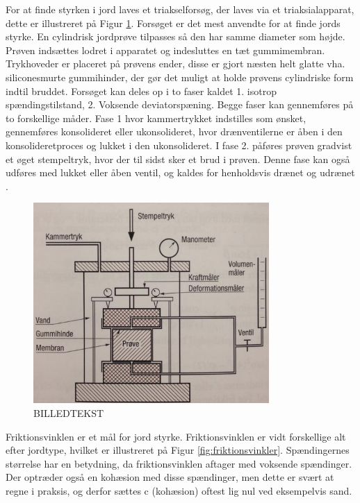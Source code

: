 For at finde styrken i jord laves et triakselforsøg, der laves via et triaksialapparat, dette er illustreret på Figur \ref{fig:forskudningsspanding}. Forsøget er det mest anvendte for at finde jords styrke. En cylindrisk jordprøve tilpasses så den har samme diameter som højde. Prøven indsættes lodret i apparatet og indesluttes en tæt gummimembran. Trykhoveder er placeret på prøvens ender, disse er gjort næsten helt glatte vha. siliconesmurte gummihinder, der gør det muligt at holde prøvens cylindriske form indtil bruddet.  
\newline \indent{     } Forsøget kan deles op i to faser kaldet 1. isotrop spændingstilstand, 2. Voksende deviatorspæning. Begge faser kan gennemføres på to forskellige måder. Fase 1 hvor kammertrykket indstilles som ønsket, gennemføres konsolideret eller ukonsolideret, hvor drænventilerne er åben i den konsolideretproces og lukket i den ukonsolideret. I fase 2. påføres prøven gradvist et øget stempeltryk, hvor der til sidst sker et brud i prøven. Denne fase kan også udføres med lukket eller åben ventil, og kaldes for henholdsvis drænet og udrænet \citep{geoteknik}.
\begin{figure}[htbp] \centering
	\begin{minipage}[b]{0.48\textwidth}\centering
		\includegraphics[width=0.8\textwidth]{billeder/forskud.png}
		\caption{BILLEDTEKST}
		\label{fig:forskudningsspanding}
	\end{minipage}\hfill
\end{figure}

\indent{     } 																																																																																																																																																																																						 Friktionsvinklen er et mål for jord styrke. Friktionsvinklen er vidt forskellige alt efter jordtype, hvilket er illustreret på Figur \ref{fig:friktionsvinkler}. Spændingernes størrelse har en betydning, da friktionsvinklen aftager med voksende spændinger. Der optræder også en kohæsion med disse spændinger, men dette er svært at regne i praksis, og derfor sættes c (kohæsion) oftest lig nul ved eksempelvis sand. 


